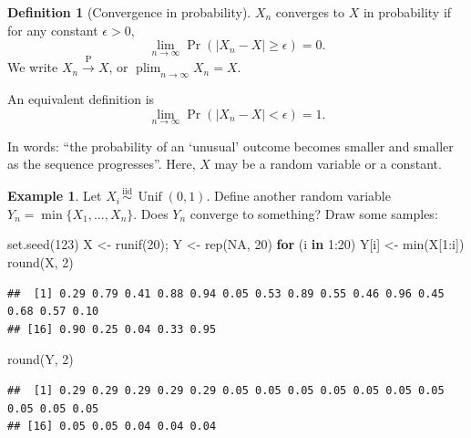 \documentclass[
]{book}
\newenvironment{Shaded}{\begin{snugshade}}{\end{snugshade}}
\newcommand{\ConstantTok}[1]{\textcolor[rgb]{0.00,0.00,0.00}{#1}}
\newcommand{\ControlFlowTok}[1]{\textcolor[rgb]{0.13,0.29,0.53}{\textbf{#1}}}
\newcommand{\DecValTok}[1]{\textcolor[rgb]{0.00,0.00,0.81}{#1}}
\newcommand{\FunctionTok}[1]{\textcolor[rgb]{0.00,0.00,0.00}{#1}}
\newcommand{\NormalTok}[1]{#1}
\newcommand{\OtherTok}[1]{\textcolor[rgb]{0.56,0.35,0.01}{#1}}
\newcommand{\SpecialCharTok}[1]{\textcolor[rgb]{0.00,0.00,0.00}{#1}}
\DeclareMathOperator{\Unif}{Unif}
\newcommand{\iid}{\,\overset{\text{iid}}{\sim}\,}
\DeclareMathOperator*{\plim}{plim}
\theoremstyle{definition}
\newtheorem{definition}{Definition}[chapter]
\theoremstyle{definition}
\newtheorem{example}{Example}[chapter]
\theoremstyle{definition}
\theoremstyle{definition}
\theoremstyle{remark}
\begin{document}
\begin{definition}[Convergence in probability]
\(X_n\) converges to \(X\) in probability if for any constant \(\epsilon>0\),
\[\lim_{n\to\infty} \Pr(|X_n-X|\geq\epsilon) = 0.\]
We write
\(X_n\xrightarrow{\text{P}}X\), or \(\plim_{n\to\infty}X_n = X\).
\end{definition}

An equivalent definition is
\[
  \lim_{n\to\infty}\Pr(|X_n-X| < \epsilon)  = 1.
\]

In words: ``the probability of an `unusual' outcome becomes smaller and smaller as the sequence progresses''.
Here, \(X\) may be a random variable or a constant.

\begin{example}
Let \(X_i\iid \Unif(0,1)\). Define another random variable \(Y_n=\min\{X_1,\dots,X_n\}\). Does \(Y_n\) converge to something? Draw some samples:

\begin{Shaded}
\begin{Highlighting}[]
\FunctionTok{set.seed}\NormalTok{(}\DecValTok{123}\NormalTok{)}
\NormalTok{X }\OtherTok{\textless{}{-}} \FunctionTok{runif}\NormalTok{(}\DecValTok{20}\NormalTok{); Y }\OtherTok{\textless{}{-}} \FunctionTok{rep}\NormalTok{(}\ConstantTok{NA}\NormalTok{, }\DecValTok{20}\NormalTok{)}
\ControlFlowTok{for}\NormalTok{ (i }\ControlFlowTok{in} \DecValTok{1}\SpecialCharTok{:}\DecValTok{20}\NormalTok{) Y[i] }\OtherTok{\textless{}{-}} \FunctionTok{min}\NormalTok{(X[}\DecValTok{1}\SpecialCharTok{:}\NormalTok{i]) }
\FunctionTok{round}\NormalTok{(X, }\DecValTok{2}\NormalTok{)}
\end{Highlighting}
\end{Shaded}

\begin{verbatim}
##  [1] 0.29 0.79 0.41 0.88 0.94 0.05 0.53 0.89 0.55 0.46 0.96 0.45 0.68 0.57 0.10
## [16] 0.90 0.25 0.04 0.33 0.95
\end{verbatim}

\begin{Shaded}
\begin{Highlighting}[]
\FunctionTok{round}\NormalTok{(Y, }\DecValTok{2}\NormalTok{)}
\end{Highlighting}
\end{Shaded}

\begin{verbatim}
##  [1] 0.29 0.29 0.29 0.29 0.29 0.05 0.05 0.05 0.05 0.05 0.05 0.05 0.05 0.05 0.05
## [16] 0.05 0.05 0.04 0.04 0.04
\end{verbatim}


\end{example}
\end{document}
